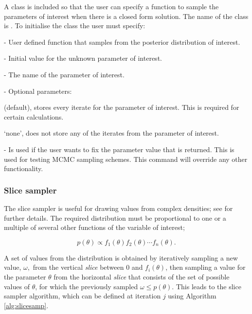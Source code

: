 \documentclass[article]{jss}
\begin{document}
A class is included so that the user can specify a function to sample
the parameters of interest when there is a closed form solution. The
name of the class is . To initialise the class the
user must specify:
\begin{description}
\item {} - User defined function that samples from the
  posterior distribution of interest.
\item {} - Initial value for the unknown parameter of
  interest.
\item {} - The name of the parameter of interest.
\item {} - Optional parameters:

\begin{description}
\item {}
  \begin{description}
  \item {} (default), stores every iterate for the parameter
    of interest. This is required for certain calculations.
  \item `none', does not store any of the iterates from the parameter
    of interest.
  \end{description}
\item {} - Is used if the user wants to fix the
  parameter value that is returned. This is used for testing MCMC
  sampling schemes.  This command will override any other
  functionality.
\end{description}
\end{description}

\subsubsection{Slice sampler}

The slice sampler is useful for drawing values from complex densities;
see \citet{Radford2003} for further details. The required distribution
must be proportional to one or a multiple of several other functions
of the variable of interest;

\[p(\theta)\propto f_{1}(\theta)f_{2}(\theta)\cdots f_{n}(\theta).\]

A set of values from the distribution is obtained by iteratively
sampling a new value, $\omega,$ from the vertical \emph{slice} between
0 and $f_{i}(\theta)$, then sampling a value for the parameter
$\theta$ from the horizontal \emph{slice} that consists of the set of
possible values of $\theta$, for which the previously sampled
$\omega\le p(\theta)$.  This leads to the slice sampler algorithm,
which can be defined at iteration $j$ using Algorithm
\ref{alg:slicesamp}.
\end{document}
